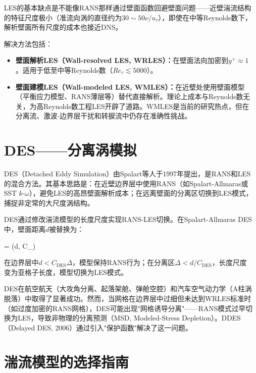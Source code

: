 LES的基本缺点是不能像RANS那样通过壁面函数回避壁面问题——近壁湍流结构的特征尺度极小（准流向涡的直径约为$30\sim 50\nu/u_{\tau}$），即使在中等Reynolds数下，解析壁面所有尺度的成本也接近DNS。

解决方法包括：
\begin{itemize}
  \item \textbf{壁面解析LES（Wall-resolved LES, WRLES）：}在壁面法向加密到$y^{+}\approx 1$。适用于低至中等Reynolds数（$Re_{\tau}\lesssim 5000$）。
  \item \textbf{壁面建模LES（Wall-modeled LES, WMLES）：}在近壁处使用壁面模型（平衡应力模型、RANS薄层等）替代直接解析。理论上成本与Reynolds数无关，为高Reynolds数工程LES开辟了道路。WMLES是当前的研究热点，但在分离流、激波-边界层干扰和转捩流中仍存在准确性挑战。
\end{itemize}

\section{DES——分离涡模拟}

DES（Detached Eddy Simulation）由Spalart等人于1997年提出，是RANS和LES的混合方法。其基本思路是：在近壁边界层中使用RANS（如Spalart-Allmaras或SST $k$-$\omega$），避免LES的高昂壁面解析成本；在远离壁面的分离区切换到LES模式，捕捉非定常的大尺度涡结构。

DES通过修改湍流模型的长度尺度实现RANS-LES切换。在Spalart-Allmaras DES中，壁面距离$d$被替换为：

\begin{myformula}
 = \min(d, C_{}\Delta)
\end{myformula}

在边界层中$d < C_{\text{DES}}\Delta$，模型保持RANS行为；在分离区$\Delta < d/C_{\text{DES}}$，长度尺度变为亚格子长度，模型切换为LES模式。

\begin{remark}
DES在航空航天（大攻角分离、起落架舱、弹舱空腔）和汽车空气动力学（A柱涡脱落）中取得了显著成功。然而，当网格在边界层中过细但未达到WRLES标准时（如过度加密的RANS网格），DES可能出现"网格诱导分离"——RANS模式过早切换为LES，导致非物理的分离预测（MSD, Modeled-Stress Depletion）。DDES（Delayed DES, 2006）通过引入"保护函数"解决了这一问题。
\end{remark}

\section{湍流模型的选择指南}

